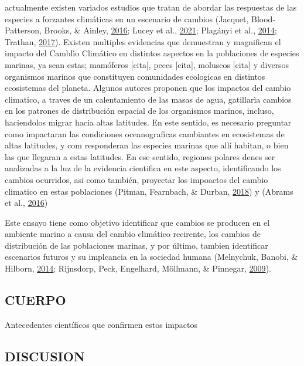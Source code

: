\documentclass[
]{article}
\begin{document}
actualmente existen variados estudios que tratan de abordar las
respuestas de las especies a forzantes climáticas en un escenario de
cambios (Jacquet, Blood-Patterson, Brooks, \& Ainley,
\protect\hyperlink{ref-Jacquet2016a}{2016}; Lucey et al.,
\protect\hyperlink{ref-Lucey2021}{2021}; Plagányi et al.,
\protect\hyperlink{ref-Plaganyi2014}{2014}; Trathan,
\protect\hyperlink{ref-Trathan2017}{2017}). Existen multiples evidencias
que demuestran y magnifican el impacto del Camblìo Climático en
distintos aspectos en la poblaciones de especies marinas, ya sean estas;
mamóferos {[}cita{]}, peces {[}cita{]}, moluscos {[}cita{]} y diversos
organismos marinos que constituyen comunidades ecologicas en distintos
ecosistemas del planeta. Algunos autores proponen que los impactos del
cambio climatico, a traves de un calentamiento de las masas de agua,
gatillarìa cambios en los patrones de distribución espacial de los
organismos marinos, incluso, haciendolos migrar hacia altas latitudes.
En este sentido, es necesario preguntar como impactaran las condiciones
oceanograficas cambiantes en ecosistemas de altas latitudes, y com
responderan las especies marinas que allí habitan, o bien las que
llegaran a estas latitudes. En ese sentido, regiones polares denes ser
analizadas a la luz de la evidencia cientifica en este aspecto,
identificando los cambios ocurridos, asi como también, proyectar los
impoactos del cambio climatico en estas poblaciones (Pitman, Fearnbach,
\& Durban, \protect\hyperlink{ref-Pitman2018a}{2018}) y (Abrams et al.,
\protect\hyperlink{ref-Abrams2016a}{2016})

Este ensayo tiene como objetivo identificar que cambios se producen en
el ambiente marino a causa del cambio climático recirente, los cambios
de distribución de las poblaciones marinas, y por último, tambien
identificar escenarios futuros y su implcancia en la sociedad humana
(Melnychuk, Banobi, \& Hilborn,
\protect\hyperlink{ref-Melnychuk2014}{2014}; Rijnsdorp, Peck, Engelhard,
Möllmann, \& Pinnegar, \protect\hyperlink{ref-Rijnsdorp2009}{2009}).

\pagebreak

\hypertarget{cuerpo}{%
\subsection{CUERPO}\label{cuerpo}}

Antecedentes científicos que confirmen estos impactos

\pagebreak

\hypertarget{discusion}{%
\subsection{DISCUSION}\label{discusion}}
\end{document}
